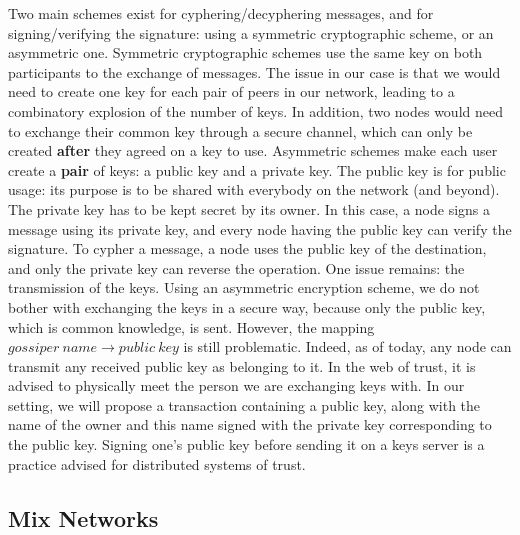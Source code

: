 \documentclass[11pt, a4paper]{article}
\begin{document}
        Two main schemes exist for cyphering/decyphering messages, and for signing/verifying the signature: using a symmetric cryptographic scheme, or an asymmetric one.
        \bigbreak
        Symmetric cryptographic schemes use the same key on both participants to the exchange of messages.
        The issue in our case is that we would need to create one key for each pair of peers in our network, leading to a combinatory explosion of the number of keys.
        In addition, two nodes would need to exchange their common key through a secure channel, which can only be created \textbf{after} they agreed on a key to use.
        \bigbreak
        Asymmetric schemes make each user create a \textbf{pair} of keys: a public key and a private key.
        The public key is for public usage: its purpose is to be shared with everybody on the network (and beyond).
        The private key has to be kept secret by its owner.
        In this case, a node signs a message using its private key, and every node having the public key can verify the signature.
        To cypher a message, a node uses the public key of the destination, and only the private key can reverse the operation.
        \bigbreak
        One issue remains: the transmission of the keys.
        Using an asymmetric encryption scheme, we do not bother with exchanging the keys in a secure way, because only the public key, which is common knowledge, is sent.
        However, the mapping $gossiper~name \rightarrow public~key$ is still problematic.
        Indeed, as of today, any node can transmit any received public key as belonging to it.
        \bigbreak
        In the web of trust, it is advised to physically meet the person we are exchanging keys with.
        In our setting, we will propose a transaction containing a public key, along with the name of the owner and this name signed with the private key corresponding to the public key.
        Signing one's public key before sending it on a keys server is a practice advised for distributed systems of trust.

    \subsection{Mix Networks}
\end{document}
